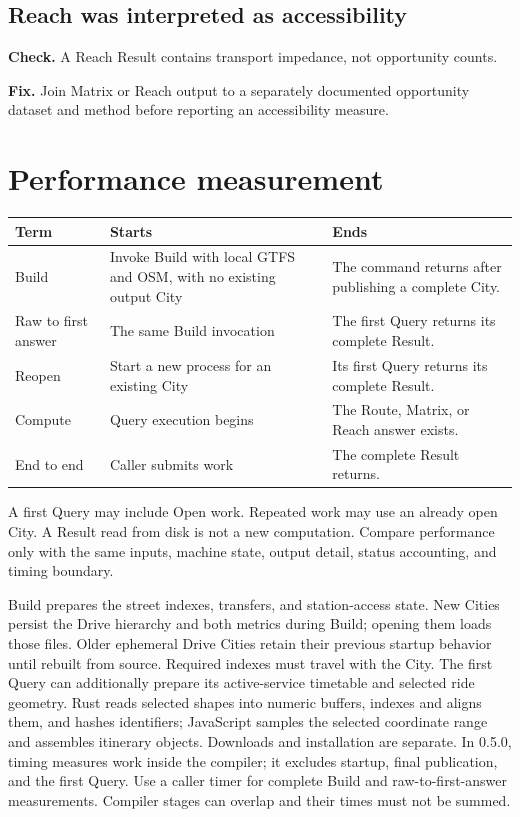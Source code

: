 \documentclass[10pt,letterpaper]{article}
\begin{document}
\subsection{Reach was interpreted as accessibility}

\textbf{Check.} A Reach Result contains transport impedance, not opportunity counts.

\textbf{Fix.} Join Matrix or Reach output to a separately documented opportunity dataset and method before reporting an accessibility measure.

\clearpage
\appendix

\section{Performance measurement}

\begin{center}
\begin{tabularx}{\linewidth}{P{1.05in} Y Y}
\toprule
\textbf{Term} & \textbf{Starts} & \textbf{Ends} \\
\midrule
Build & Invoke Build with local GTFS and OSM, with no existing output City & The command returns after publishing a complete City. \\
Raw to first answer & The same Build invocation & The first Query returns its complete Result. \\
Reopen & Start a new process for an existing City & Its first Query returns its complete Result. \\
Compute & Query execution begins & The Route, Matrix, or Reach answer exists. \\
End to end & Caller submits work & The complete Result returns. \\
\bottomrule
\end{tabularx}
\end{center}

A first Query may include Open work. Repeated work may use an already open City. A Result read from disk is not a new computation. Compare performance only with the same inputs, machine state, output detail, status accounting, and timing boundary.

Build prepares the street indexes, transfers, and station-access state. New Cities persist the Drive hierarchy and both metrics during Build; opening them loads those files. Older ephemeral Drive Cities retain their previous startup behavior until rebuilt from source. Required indexes must travel with the City. The first Query can additionally prepare its active-service timetable and selected ride geometry. Rust reads selected shapes into numeric buffers, indexes and aligns them, and hashes identifiers; JavaScript samples the selected coordinate range and assembles itinerary objects. Downloads and installation are separate. In 0.5.0,  timing  measures work inside the compiler; it excludes startup, final publication, and the first Query. Use a caller timer for complete Build and raw-to-first-answer measurements. Compiler stages can overlap and their times must not be summed.
\end{document}
